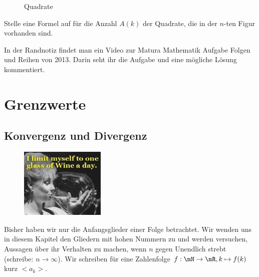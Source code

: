 \documentclass[%
11pt,%
twoside,%
titlepage,%
german,%
headsepline%
]{scrartcl}
\begin{document}
\begin{ueb}[Quadrate]
\begin{figure}
{
}
\caption{Quadrate}\label{ueb:quadrate}
\end{figure}
Stelle eine Formel auf f\"ur die Anzahl $A(k)$ der Quadrate, die in der $n$-ten Figur vorhanden sind.
\end{ueb}

\begin{ueb}
In
der Randnotiz findet man ein Video zur Matura Mathematik Aufgabe Folgen und Reihen von 2013. Darin seht ihr die Aufgabe und eine mögliche Lösung kommentiert.
\end{ueb}

\section{Grenzwerte}
\subsection{Konvergenz und Divergenz}
\begin{figure}
\vspace{-23pt}
  \begin{center}
    \includegraphics[width=0.36\textwidth]{pictures/limit}
  \end{center}
\vspace{-20pt}
\end{figure}
Bisher haben wir nur die Anfangsglieder einer Folge betrachtet. Wir wenden uns in diesem Kapitel den Gliedern mit hohen Nummern zu und werden versuchen, Aussagen \"uber ihr Verhalten zu machen, wenn $n$ gegen Unendlich strebt (schreibe: $n\to\infty$).
Wir schreiben f\"ur eine Zahlenfolge $f:\mN\to\mR, k\mapsto f(k)$ kurz $<a_k>$.
\end{document}
